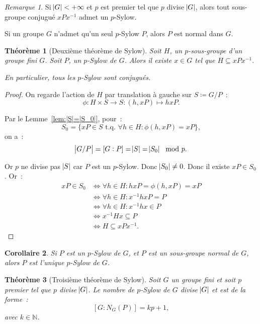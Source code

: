 \documentclass{article}
\newtheorem{thm}{Théorème}[section]
\newtheorem{cor}[thm]{Corollaire}
\theoremstyle{definition}
\theoremstyle{remark}
\newtheorem*{rmq}{Remarque}
\newcommand{\N}{\mathbb N}
\newcommand{\tq}{\text{ t.q. }}
\begin{document}
	\begin{rmq} Si $\abs G < +\infty$ et $p$ est premier tel que $p$ divise $\abs G$, alors tout sous-groupe conjugué $xPx^{-1}$ admet un $p$-Sylow.

	Si un groupe $G$ n'admet qu'un seul $p$-Sylow $P$, alors $P$ est normal dans $G$.
	\end{rmq}

	\begin{thm}[Deuxième théorème de Sylow] Soit $H$, un $p$-sous-groupe d'un groupe fini $G$. Soit $P$, un $p$-Sylow de $G$. Alors il existe $x \in G$ tel que
	$H \subseteq xPx^{-1}$.

	En particulier, tous les $p$-Sylow sont conjugués.
	\end{thm}

	\begin{proof} On regarde l'action de $H$ par translation à gauche sur $S \coloneqq G/P$~:
	\[\phi : H \times S \to S : (h, xP) \mapsto hxP.\]

	Par le Lemme~\ref{lem:|S|=|S_0|}, pour~:
	\[S_0 = \{xP \in S \tq \forall h \in H : \phi(h, xP) = xP\},\]
	on a~:
	\[\abs {G/P} = [G:P] = \abs S = \abs {S_0} \mod p.\]

	Or $p$ ne divise pas $\abs S$ car $P$ est un $p$-Sylow. Donc $\abs {S_0} \neq 0$. Donc il existe $xP \in S_0$. Or~:
	\begin{align*}
		xP \in S_0 &\iff \forall h \in H : hxP = \phi(h, xP) = xP \\
		&\iff \forall h \in H : x^{-1}hxP = P \\
		&\iff \forall h \in H : x^{-1}hx \in P \\
		&\iff x^{-1}Hx \subseteq P \\
		&\iff H \subseteq xPx^{-1}.
	\end{align*}
	\end{proof}

	\begin{cor} Si $P$ est un $p$-Sylow de $G$, et $P$ est un sous-groupe normal de $G$, alors $P$ est l'unique $p$-Sylow de $G$.
	\end{cor}

	\begin{thm}[Troisième théorème de Sylow] Soit $G$ un groupe fini et soit $p$ premier tel que $p$ divise $\abs G$. Le nombre de $p$-Sylow de $G$ divise
	$\abs G$ et est de la forme~:
	\[[G:N_G(P)] = kp + 1,\]
	avec $k \in \N$.
	\end{thm}
\end{document}
